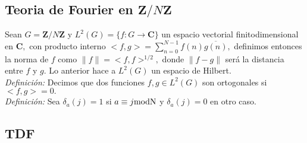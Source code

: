 \documentclass[a4paper,openright,10pt]{article}
\begin{document}
\subsection{Teoria de Fourier en $\mathbf{Z}/N\mathbf{Z}$}

Sean $G=\mathbf{Z}/N\mathbf{Z}$ y $L^{2} (G)=\{f:G \rightarrow \mathbf{C} \}$ un espacio vectorial finitodimensional en $\mathbf{C},$ con producto interno $<f,g>=\sum\limits_{n=0}^{N-1} f(n)\overline{g(n)},$ definimos entonces la norma de $f$ como $\parallel f\parallel = <f,f>^{1/2},$ donde $\parallel f-g \parallel$ ser\'a la distancia entre $f$ y $g.$ Lo anterior hace a $L^{2}(G)$ un espacio de Hilbert.\\ 
\textsl{Definici\'on:} Decimos que dos funciones $f,g \in L^{2}(G)$ son ortogonales si $<f,g>=0.$\\
\textsl{Definici\'on:} Sea $\delta_{a}(j)=1$ si $a\equiv j \textnormal{modN}$ y $\delta_{a}(j)=0$ en otro caso.\\
\subsection{TDF}
\end{document}
